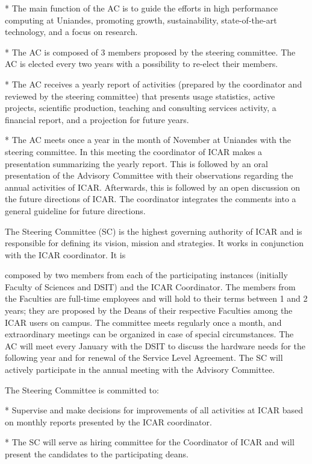 \documentclass{article}
\begin{document}
* The main function of the AC is to guide the efforts in high performance computing at Uniandes, promoting growth, sustainability, state-of-the-art technology, and a focus on research.

* The AC is composed of 3 members proposed by the steering committee. The AC is elected every two years with a possibility to re-elect their members.

* The AC receives a yearly report of activities (prepared by the coordinator and reviewed by the steering committee) that presents usage statistics, active projects, scientific production, teaching and consulting services activity, a financial report, and a projection for future years.

* The AC meets once a year in the month of November at Uniandes with the steering committee. In this meeting the coordinator of ICAR makes a presentation summarizing the yearly report. This is followed by an oral presentation of the Advisory Committee with their observations regarding the annual activities of ICAR. Afterwards, this is followed by an open discussion on the future directions of ICAR. The coordinator integrates the comments into a general guideline for future directions.

The Steering Committee (SC) is the highest governing authority of ICAR and is responsible for defining its vision, mission and strategies. It works in conjunction with the ICAR coordinator. It is

composed by two members from each of the participating instances (initially Faculty of Sciences and DSIT) and the ICAR Coordinator. The members from the Faculties are full-time employees and will hold to their terms between 1 and 2 years; they are proposed by the Deans of their respective Faculties among the ICAR users on campus. The committee meets regularly once a month, and extraordinary meetings can be organized in case of special circumstances. The AC will meet every January with the DSIT to discuss the hardware needs for the following year and for renewal of the Service Level Agreement. The SC will actively participate in the annual meeting with the Advisory Committee.

The Steering Committee is committed to:

* Supervise and make decisions for improvements of all activities at ICAR based on monthly reports presented by the ICAR coordinator.

* The SC will serve as hiring committee for the Coordinator of ICAR and will present the candidates to the participating deans.
\end{document}
